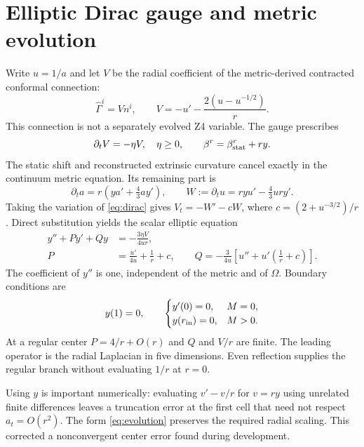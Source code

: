 \documentclass[11pt]{article}
\newcommand{\Om}{\Omega}
\begin{document}
\section{Elliptic Dirac gauge and metric evolution}
Write $u=1/a$ and let $V$ be the radial coefficient of the metric-derived
contracted conformal connection:
\begin{equation}
 \widehat\Gamma^i=Vn^i,\qquad
 V=-u'-\frac{2(u-u^{-1/2})}{r}.
 \label{eq:dirac}
\end{equation}
This connection is not a separately evolved Z4 variable. The gauge prescribes
\begin{equation}
 \partial_t V=-\eta V,\quad \eta\geq0,\qquad
 \beta^r=\beta_{\rm stat}^r+r y.
\end{equation}
The static shift and reconstructed extrinsic curvature cancel exactly in the
continuum metric equation. Its remaining part is
\begin{equation}
 \partial_t a=r\left(ya'+\tfrac43 ay'\right),\qquad
 W:=\partial_tu=r y u'-\tfrac43ur y'.
 \label{eq:evolution}
\end{equation}
Taking the variation of \eqref{eq:dirac} gives $V_t=-W'-cW$, where
$c=(2+u^{-3/2})/r$. Direct substitution yields the scalar elliptic equation
\begin{align}
 y''+P y'+Qy&=-\frac{3\eta V}{4ur},\label{eq:elliptic}\\
 P&=\frac{u'}{4u}+\frac1r+c,\qquad
 Q=-\frac3{4u}\left[u''+u'\left(\frac1r+c\right)\right].
\end{align}
The coefficient of $y''$ is one, independent of the metric and of $\Om$.
Boundary conditions are
\begin{equation}
 y(1)=0,\qquad
 \begin{cases} y'(0)=0, & M=0,\\ y(r_{\rm in})=0, & M>0.\end{cases}
 \label{eq:bc}
\end{equation}
At a regular center $P=4/r+O(r)$ and $Q$ and $V/r$ are finite. The leading
operator is the radial Laplacian in five dimensions. Even reflection supplies
the regular branch without evaluating $1/r$ at $r=0$.

Using $y$ is important numerically: evaluating $v'-v/r$ for $v=ry$ using unrelated
finite differences leaves a truncation error at the first cell that need not
respect $a_t=O(r^2)$. The form \eqref{eq:evolution} preserves the required radial
scaling. This corrected a nonconvergent center error found during development.
\end{document}
